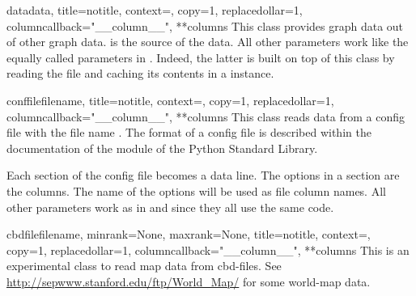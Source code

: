 \begin{classdesc}{data}{data, title=notitle, context={}, copy=1, %
                        replacedollar=1, columncallback="\_\_column\_\_", **columns}
  This class provides graph data out of other graph data. 
  is the source of the data. All other parameters work like the equally
  called parameters in . Indeed, the latter is
  built on top of this class by reading the file and caching its
  contents in a  instance.
\end{classdesc} %

\begin{classdesc}{conffile}{filename, title=notitle, context={}, copy=1, %
                            replacedollar=1, columncallback="\_\_column\_\_", **columns}
  This class reads data from a config file with the file name
  . The format of a config file is described within the
  documentation of the  module of the Python
  Standard Library.

  Each section of the config file becomes a data line. The options in
  a section are the columns. The name of the options will be used as
  file column names. All other parameters work as in
   and  since they all use
  the same code.
\end{classdesc} %

\begin{classdesc}{cbdfile}{filename, minrank=None, maxrank=None, %
                           title=notitle, context={}, copy=1,
                           replacedollar=1, columncallback="\_\_column\_\_", **columns}
  This is an experimental class to read map data from cbd-files. See
  \url{http://sepwww.stanford.edu/ftp/World_Map/} for some world-map
  data.
\end{classdesc} %

